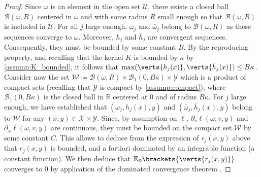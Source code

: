 \begin{proof}
	Since $\omega$ is an element in the open set $\mathcal{U}$, there exists a closed ball $\mathcal{B}(\omega,R)$ centered in $\omega$ and with some radius $R$ small enough so that $\mathcal{B}(\omega,R)$ is included in $\mathcal{U}$. For all $j$ large enough, $\omega_j$ and $\bar{\omega}_j$ belong to $\mathcal{B}(\omega,R)$ as these sequences converge to $\omega$. Moreover, $h_j$ and $\bar{h}_j$ are convergent sequences. Consequently, they must be bounded by some constant $B$. By the reproducing property, and recalling that the kernel $K$ is bounded by $\kappa$ by \cref{assump:K_bounded}, it follows that $\max(\verts{h_{j}(x)},\verts{\bar{h}_{j}(x)})\leq B\kappa$.  Consider now the set {$\mathcal{W}\coloneqq\mathcal{B}(\omega, R)\times \mathcal{B}_1(0, B\kappa)\times \mathcal{Y}$} which is a product of compact sets (recalling that $\mathcal{Y}$ is compact by \cref{assump:compact}){, where $\mathcal{B}_1(0, B\kappa)$ is the closed ball in $\mathbb{R}$ centered at $0$ and of radius $B\kappa$}.   
	For $j$ large enough, we have established that  $(\omega_j, h_j(x),y)$ and $(\bar{\omega}_j, \bar{h}_j(x),y)$ belong to $\mathcal{W}$ for any $(x,y)\in \mathcal{X}\times\mathcal{Y}$. 
	Since, by assumption on $\ell$, $\partial_{v}\ell(\omega,v,y)$ and $\partial_{\omega}\ell(\omega,v,y)$ are continuous, they must be bounded on the compact set $\mathcal{W}$ by some constant $C$. This allows to deduce from the expression of $r_{j}(x,y)$ above that $r_{j}(x,y)$ is bounded, and a fortiori dominated by an integrable function (a constant function). We then deduce that $\mathbb{E}_{\mathbb{\PP}}\brackets{\verts{r_j(x,y)}}$ converges to $0$ by application of the dominated convergence theorem \citep[Theorem~1.34]{rudin1987real}.
	

\end{proof}
